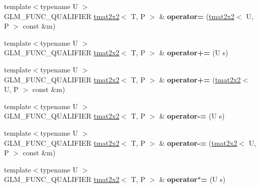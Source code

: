 \begin{DoxyCompactItemize}
\item 
{\footnotesize template$<$typename U $>$ }\\G\+L\+M\+\_\+\+F\+U\+N\+C\+\_\+\+Q\+U\+A\+L\+I\+F\+I\+ER \hyperlink{structglm_1_1detail_1_1tmat2x2}{tmat2x2}$<$ T, P $>$ \& {\bfseries operator=} (\hyperlink{structglm_1_1detail_1_1tmat2x2}{tmat2x2}$<$ U, P $>$ const \&m)\hypertarget{structglm_1_1detail_1_1tmat2x2_a08aa9a6143024b1c562f717273dbec95}{}\label{structglm_1_1detail_1_1tmat2x2_a08aa9a6143024b1c562f717273dbec95}

\item 
{\footnotesize template$<$typename U $>$ }\\G\+L\+M\+\_\+\+F\+U\+N\+C\+\_\+\+Q\+U\+A\+L\+I\+F\+I\+ER \hyperlink{structglm_1_1detail_1_1tmat2x2}{tmat2x2}$<$ T, P $>$ \& {\bfseries operator+=} (U s)\hypertarget{structglm_1_1detail_1_1tmat2x2_a4168898bfdd14fbbbaa72a36ceb1514b}{}\label{structglm_1_1detail_1_1tmat2x2_a4168898bfdd14fbbbaa72a36ceb1514b}

\item 
{\footnotesize template$<$typename U $>$ }\\G\+L\+M\+\_\+\+F\+U\+N\+C\+\_\+\+Q\+U\+A\+L\+I\+F\+I\+ER \hyperlink{structglm_1_1detail_1_1tmat2x2}{tmat2x2}$<$ T, P $>$ \& {\bfseries operator+=} (\hyperlink{structglm_1_1detail_1_1tmat2x2}{tmat2x2}$<$ U, P $>$ const \&m)\hypertarget{structglm_1_1detail_1_1tmat2x2_a907826d7a4cc2e34f772eaf6ec95c2cf}{}\label{structglm_1_1detail_1_1tmat2x2_a907826d7a4cc2e34f772eaf6ec95c2cf}

\item 
{\footnotesize template$<$typename U $>$ }\\G\+L\+M\+\_\+\+F\+U\+N\+C\+\_\+\+Q\+U\+A\+L\+I\+F\+I\+ER \hyperlink{structglm_1_1detail_1_1tmat2x2}{tmat2x2}$<$ T, P $>$ \& {\bfseries operator-\/=} (U s)\hypertarget{structglm_1_1detail_1_1tmat2x2_a0e107a55fa775eb6e5f608ab3d6d67b5}{}\label{structglm_1_1detail_1_1tmat2x2_a0e107a55fa775eb6e5f608ab3d6d67b5}

\item 
{\footnotesize template$<$typename U $>$ }\\G\+L\+M\+\_\+\+F\+U\+N\+C\+\_\+\+Q\+U\+A\+L\+I\+F\+I\+ER \hyperlink{structglm_1_1detail_1_1tmat2x2}{tmat2x2}$<$ T, P $>$ \& {\bfseries operator-\/=} (\hyperlink{structglm_1_1detail_1_1tmat2x2}{tmat2x2}$<$ U, P $>$ const \&m)\hypertarget{structglm_1_1detail_1_1tmat2x2_acde6e0cc0e3c1df956a9e5fd0f3bbacd}{}\label{structglm_1_1detail_1_1tmat2x2_acde6e0cc0e3c1df956a9e5fd0f3bbacd}

\item 
{\footnotesize template$<$typename U $>$ }\\G\+L\+M\+\_\+\+F\+U\+N\+C\+\_\+\+Q\+U\+A\+L\+I\+F\+I\+ER \hyperlink{structglm_1_1detail_1_1tmat2x2}{tmat2x2}$<$ T, P $>$ \& {\bfseries operator$\ast$=} (U s)\hypertarget{structglm_1_1detail_1_1tmat2x2_a4a5205fca7f31a7a453210d511cf2896}{}\label{structglm_1_1detail_1_1tmat2x2_a4a5205fca7f31a7a453210d511cf2896}


\end{DoxyCompactItemize}
